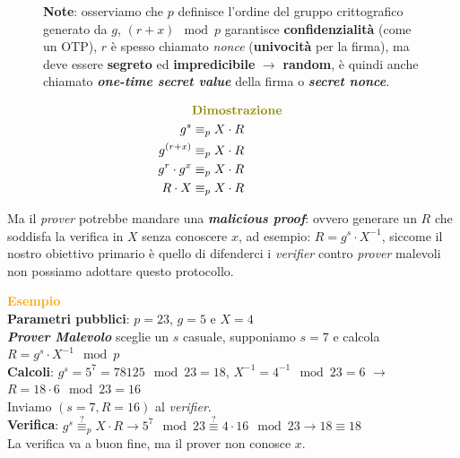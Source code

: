 \begin{flushleft}
    \begin{figure}[h]
        \centering
        \begin{minipage}[c]{0.45\textwidth}
            \textbf{Note}: osserviamo che $p$ definisce l'ordine del gruppo crittografico generato da $g$, $(r + x) \mod p$ garantisce \textbf{confidenzialità} (come un OTP), $r$ è spesso chiamato \textit{nonce} (\textbf{univocità} per la firma), ma deve essere \textbf{segreto} ed \textbf{impredicibile} $\rightarrow$ \textbf{random}, è quindi anche chiamato \textbf{\textit{one-time secret value}} della firma o \textbf{\textit{secret nonce}}.
        \end{minipage}
        \hfill
        \begin{minipage}[c]{0.45\textwidth}
            \begin{align*}
                & \textcolor{olive}{\textbf{Dimostrazione}} \quad & \\
                g^s &\equiv_p X \cdot R \\
                g^{(r + x)} &\equiv_p X \cdot R \\
                g^r \cdot g^x &\equiv_p X \cdot R \\
                R \cdot X &\equiv_p X \cdot R
            \end{align*}
        \end{minipage}
    \end{figure}

    Ma il \textit{prover} potrebbe mandare una \textbf{\textit{malicious proof}}: ovvero generare un $R$ che soddisfa la verifica in $X$ senza conoscere $x$, ad esempio: $R = g^s \cdot X^{-1}$, siccome il nostro obiettivo primario è quello di difenderci i \textit{verifier} contro \textit{prover} malevoli non possiamo adottare questo protocollo.
\end{flushleft}

\begin{boxA}

    \textcolor{orange}{\textbf{Esempio}} \\
    \textbf{Parametri pubblici}: $p = 23$, $g = 5$ e $X = 4$\\
    \textbf{\textit{Prover Malevolo}} sceglie un $s$ casuale, supponiamo $s = 7$ e calcola $R = g^s \cdot X^{-1} \mod p$ \\
    \textbf{Calcoli}: $g^s = 5^7 = 78125 \mod 23 = 18$, $X^{-1} = 4^{-1} \mod 23 = 6$ $\rightarrow$ $R = 18 \cdot 6 \mod 23 = 16$ \\
    Inviamo $(s = 7, R = 16)$ al \textit{verifier}. \\
    \textbf{Verifica}: $g^s \overset{?}{\equiv}_p X \cdot R \rightarrow 5^7 \mod 23 \overset{?}{\equiv} 4 \cdot 16 \mod 23 \rightarrow 18 \equiv 18$ \\
    La verifica va a buon fine, ma il prover non conosce $x$.
\end{boxA}

